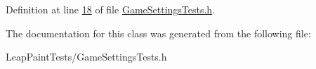Definition at line \hyperlink{_game_settings_tests_8h_source_l00018}{18} of file \hyperlink{_game_settings_tests_8h_source}{Game\-Settings\-Tests.\-h}.



The documentation for this class was generated from the following file\-:\begin{DoxyCompactItemize}
\item 
Leap\-Paint\-Tests/Game\-Settings\-Tests.\-h\end{DoxyCompactItemize}
